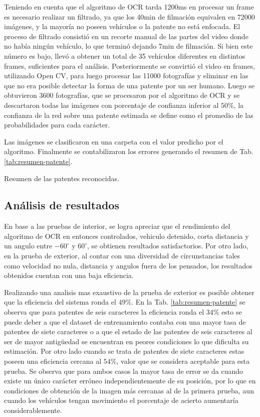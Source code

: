 Teniendo en cuenta que el algoritmo de OCR tarda 1200ms en procesar un frame es necesario realizar un filtrado, ya que los 40min de filmación equivalen en 72000 imágenes, y la mayoría no poseen vehículos o la patente no está enfocada.
El proceso de filtrado consistió en un recorte manual de las partes del video donde no había ningún vehículo, lo que terminó dejando 7min de filmación. Si bien este número es bajo, llevó a obtener un total de 35 vehículos diferentes en distintos frames, suficientes para el análisis. Posteriormente se convirtió el video en frames, utilizando Open CV, para luego procesar las 11000 fotografías y eliminar en las que no era posible detectar la forma de una patente por un ser humano. Luego se obtuvieron 3600 fotografías, que se procesaron por el algoritmo de OCR y se descartaron todas las imágenes con porcentaje de confianza inferior al $50\%$, la confianza de la red sobre una patente estimada se define como el promedio de las probabilidades para cada carácter.

Las imágenes se clasificaron en una carpeta con el valor predicho por el algoritmo.
Finalmente se contabilizaron los errores generando el resumen de Tab. \ref{tab:resumen-patente}.

\begin{table}
    \centering
    
    \caption{Resumen de las patentes reconocidas.}
    \label{tab:resumen-patente}
\end{table}


\subsection{Análisis de resultados}

En base a las pruebas de interior, se logra apreciar que el rendimiento del algoritmo de OCR en entonces controlados, vehiculo detenido, corta distancia y un angulo entre $-60^\circ$ y $60^\circ$, se obtienen resultados satisfactorios. Por otro lado, en la prueba de exterior, al contar con una diversidad de circunstancias tales como velocidad no nula, distancia y angulos fuera de los pensados, los resultados obtenidos cuentan con una baja eficiencia.


Realizando una analisis mas exaustivo de la prueba de exterior es posible obtener que la eficiencia del sistema ronda el $49\%$.
En la Tab. \ref{tab:resumen-patente} se observa que para patentes de seis caracteres la eficiencia ronda el $34\%$ esto se puede deber a que el dataset de entrenamiento contaba con una mayor tasa de patentes de siete caracteres o a que el estado de las patentes de seis caracteres al ser de mayor antigüedad se encuentran en peores condiciones lo que dificulta su estimación.
Por otro lado cuando se trata de patentes de siete caracteres estas poseen una eficiencia cercana al $54\%$, valor que se considera aceptable para esta prueba.
Se observa que para ambos casos la mayor tasa de error se da cuando existe un único carácter erróneo independientemente de su posición, por lo que en condiciones de obtención de la imagen más cercanas al de la primera prueba, aun cuando los vehículos tengan movimiento el porcentaje de acierto aumentaría considerablemente.

